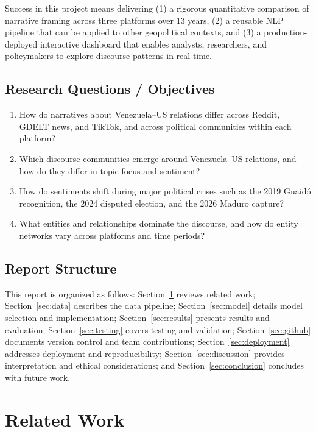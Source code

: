 \documentclass[12pt, letterpaper]{article}
\begin{document}
Success in this project means delivering (1) a rigorous quantitative comparison of narrative framing across three platforms over 13 years, (2) a reusable NLP pipeline that can be applied to other geopolitical contexts, and (3) a production-deployed interactive dashboard that enables analysts, researchers, and policymakers to explore discourse patterns in real time.

\subsection{Research Questions / Objectives}
\begin{enumerate}[label=\textbf{RQ\arabic*.}]
  \item How do narratives about Venezuela--US relations differ across Reddit, GDELT news, and TikTok, and across political communities within each platform?
  \item Which discourse communities emerge around Venezuela--US relations, and how do they differ in topic focus and sentiment?
  \item How do sentiments shift during major political crises such as the 2019 Guaid\'{o} recognition, the 2024 disputed election, and the 2026 Maduro capture?
  \item What entities and relationships dominate the discourse, and how do entity networks vary across platforms and time periods?
\end{enumerate}

\subsection{Report Structure}
This report is organized as follows: Section~\ref{sec:related} reviews related work; Section~\ref{sec:data} describes the data pipeline; Section~\ref{sec:model} details model selection and implementation; Section~\ref{sec:results} presents results and evaluation; Section~\ref{sec:testing} covers testing and validation; Section~\ref{sec:github} documents version control and team contributions; Section~\ref{sec:deployment} addresses deployment and reproducibility; Section~\ref{sec:discussion} provides interpretation and ethical considerations; and Section~\ref{sec:conclusion} concludes with future work.

\section{Related Work}
\label{sec:related}
\end{document}
